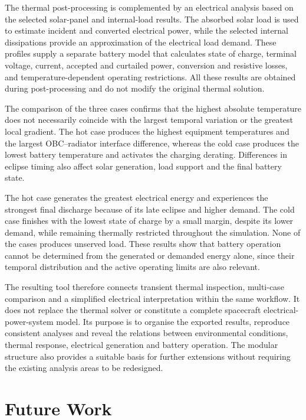 The thermal post-processing is complemented by an electrical analysis based on
the selected solar-panel and internal-load results. The absorbed solar load is
used to estimate incident and converted electrical power, while the selected
internal dissipations provide an approximation of the electrical load demand.
These profiles supply a separate battery model that calculates state of charge,
terminal voltage, current, accepted and curtailed power, conversion and
resistive losses, and temperature-dependent operating restrictions. All these
results are obtained during post-processing and do not modify the original
thermal solution.

The comparison of the three cases confirms that the highest absolute
temperature does not necessarily coincide with the largest temporal variation
or the greatest local gradient. The hot case produces the highest equipment
temperatures and the largest OBC--radiator interface difference, whereas the
cold case produces the lowest battery temperature and activates the charging
derating. Differences in eclipse timing also affect solar generation, load
support and the final battery state.

The hot case generates the greatest electrical energy and experiences the
strongest final discharge because of its late eclipse and higher demand. The
cold case finishes with the lowest state of charge by a small margin, despite
its lower demand, while remaining thermally restricted throughout the
simulation. None of the cases produces unserved load. These results show that
battery operation cannot be determined from the generated or demanded energy
alone, since their temporal distribution and the active operating limits are
also relevant.

The resulting tool therefore connects transient thermal inspection,
multi-case comparison and a simplified electrical interpretation within the
same workflow. It does not replace the thermal solver or constitute a complete
spacecraft electrical-power-system model. Its purpose is to organise the
exported results, reproduce consistent analyses and reveal the relations
between environmental conditions, thermal response, electrical generation and
battery operation. The modular structure also provides a suitable basis for
further extensions without requiring the existing analysis areas to be
redesigned.


\section{Future Work}
\label{sec:future_work}


